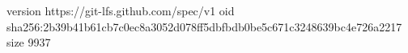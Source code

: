 version https://git-lfs.github.com/spec/v1
oid sha256:2b39b41b61cb7c0ec8a3052d078ff5dbfbdb0be5c671c3248639bc4e726a2217
size 9937
